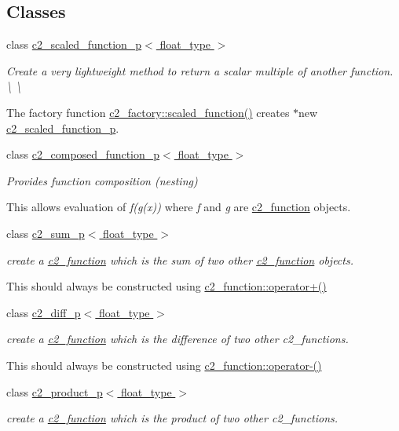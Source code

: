 \subsection*{Classes}
\begin{DoxyCompactItemize}
\item 
class \hyperlink{classc2__scaled__function__p}{c2\+\_\+scaled\+\_\+function\+\_\+p$<$ float\+\_\+type $>$}
\begin{DoxyCompactList}\small\item\em Create a very lightweight method to return a scalar multiple of another function. \textbackslash{} \textbackslash{}

The factory function \hyperlink{classc2__factory_a81a7b686b7ffa389ad4dcd8d18997332}{c2\+\_\+factory\+::scaled\+\_\+function()} creates $\ast$new \hyperlink{classc2__scaled__function__p}{c2\+\_\+scaled\+\_\+function\+\_\+p}. \end{DoxyCompactList}\item 
class \hyperlink{classc2__composed__function__p}{c2\+\_\+composed\+\_\+function\+\_\+p$<$ float\+\_\+type $>$}
\begin{DoxyCompactList}\small\item\em Provides function composition (nesting)

This allows evaluation of {\itshape f(g(x))} where {\itshape f} and {\itshape g} are \hyperlink{classc2__function}{c2\+\_\+function} objects. \end{DoxyCompactList}\item 
class \hyperlink{classc2__sum__p}{c2\+\_\+sum\+\_\+p$<$ float\+\_\+type $>$}
\begin{DoxyCompactList}\small\item\em create a \hyperlink{classc2__function}{c2\+\_\+function} which is the sum of two other \hyperlink{classc2__function}{c2\+\_\+function} objects.

This should always be constructed using \hyperlink{classc2__function_a268b206b47c55e635e5f0a9e0f3e8ded}{c2\+\_\+function\+::operator+()} \end{DoxyCompactList}\item 
class \hyperlink{classc2__diff__p}{c2\+\_\+diff\+\_\+p$<$ float\+\_\+type $>$}
\begin{DoxyCompactList}\small\item\em create a \hyperlink{classc2__function}{c2\+\_\+function} which is the difference of two other c2\+\_\+functions.

This should always be constructed using \hyperlink{classc2__function_a4c56a4673e00bfad37143c403a0c94c8}{c2\+\_\+function\+::operator-\/()} \end{DoxyCompactList}\item 
class \hyperlink{classc2__product__p}{c2\+\_\+product\+\_\+p$<$ float\+\_\+type $>$}
\begin{DoxyCompactList}\small\item\em create a \hyperlink{classc2__function}{c2\+\_\+function} which is the product of two other c2\+\_\+functions.


\end{DoxyCompactList}
\end{DoxyCompactItemize}

